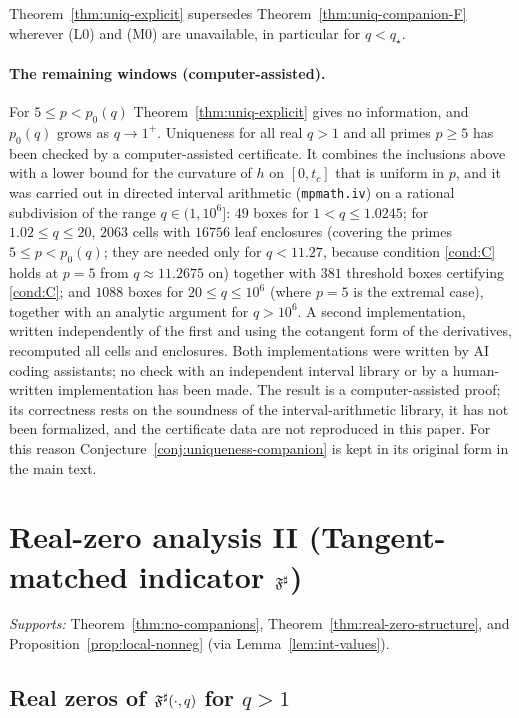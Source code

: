 \noindent Theorem~\ref{thm:uniq-explicit} supersedes Theorem~\ref{thm:uniq-companion-F} wherever (L0) and (M0) are unavailable, in particular for $q<q_\star$.

\paragraph{The remaining windows (computer-assisted).}
For $5\le p<p_0(q)$ Theorem~\ref{thm:uniq-explicit} gives no information, and $p_0(q)$ grows as $q\to1^+$. Uniqueness for all real $q>1$ and all primes $p\ge5$ has been checked by a computer-assisted certificate. It combines the inclusions above with a lower bound for the curvature of $h$ on $[0,t_c]$ that is uniform in $p$, and it was carried out in directed interval arithmetic (\texttt{mpmath.iv}) on a rational subdivision of the range $q\in(1,10^6]$: $49$ boxes for $1<q\le1.0245$; for $1.02\le q\le20$, $2063$ cells with $16756$ leaf enclosures (covering the primes $5\le p<p_0(q)$; they are needed only for $q<11.27$, because condition \eqref{cond:C} holds at $p=5$ from $q\approx11.2675$ on) together with $381$ threshold boxes certifying \eqref{cond:C}; and $1088$ boxes for $20\le q\le10^6$ (where $p=5$ is the extremal case), together with an analytic argument for $q>10^6$. A second implementation, written independently of the first and using the cotangent form of the derivatives, recomputed all cells and enclosures. Both implementations were written by AI coding assistants; no check with an independent interval library or by a human-written implementation has been made. The result is a computer-assisted proof; its correctness rests on the soundness of the interval-arithmetic library, it has not been formalized, and the certificate data are not reproduced in this paper. For this reason Conjecture~\ref{conj:uniqueness-companion} is kept in its original form in the main text.

\section{Real-zero analysis II (Tangent-matched indicator $\mathfrak F^{\sharp}$)}\label{app:real-zero-fsharp}
\noindent\textit{Supports:} Theorem~\ref{thm:no-companions}, Theorem~\ref{thm:real-zero-structure}, and Proposition~\ref{prop:local-nonneg} (via Lemma~\ref{lem:int-values}).

\subsection{Real zeros of \texorpdfstring{$\mathfrak F^{\sharp}(\cdot,q)$}{Fsharp} for \texorpdfstring{$q>1$}{q>1}}
\label{sec:real-zeros-fsharp}

